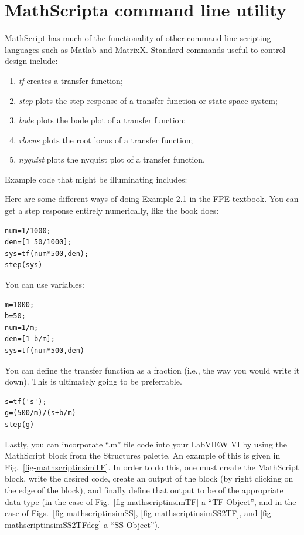 \section{MathScript\textendash a command line utility}  

MathScript has much of the functionality of other command line scripting
languages such as Matlab and MatrixX.  Standard commands useful to control
design include:
\begin{enumerate}
\item \emph{tf} creates a transfer function;
\item \emph{step} plots the step  response of a transfer function or state space
  system;
\item \emph{bode} plots the bode plot of a transfer function;
\item \emph{rlocus} plots the root locus of a transfer function;
\item \emph{nyquist} plots the nyquist plot of a transfer function.
\end{enumerate}

Example code that might be illuminating includes:

Here are some different ways of doing Example 2.1 in the FPE textbook.
You can get a step response entirely numerically, like the book does:
\begin{verbatim}
num=1/1000;
den=[1 50/1000];
sys=tf(num*500,den);
step(sys)
\end{verbatim}

You can use variables:
\begin{verbatim}
m=1000;
b=50;
num=1/m;
den=[1 b/m];
sys=tf(num*500,den)
\end{verbatim}

You can define the transfer function as a fraction (i.e., the way you would
write it down). This is ultimately going to be preferrable.
\begin{verbatim}
s=tf('s');
g=(500/m)/(s+b/m)
step(g)
\end{verbatim}

Lastly, you can incorporate ``.m'' file code into your LabVIEW VI by using the
MathScript block from the Structures palette.  An example of this is given in
Fig.~\ref{fig-mathscriptinsimTF}.  In order to do this, one must create the
MathScript block, write the desired code, create an output of the block (by
right clicking on the edge of the block), and finally define that output to be
of the appropriate data type (in the case of Fig.~\ref{fig-mathscriptinsimTF}
a ``TF Object'', and in the case of
Figs.~\ref{fig-mathscriptinsimSS}, \ref{fig-mathscriptinsimSS2TF}, and
\ref{fig-mathscriptinsimSS2TFdeg} a ``SS Object'').



